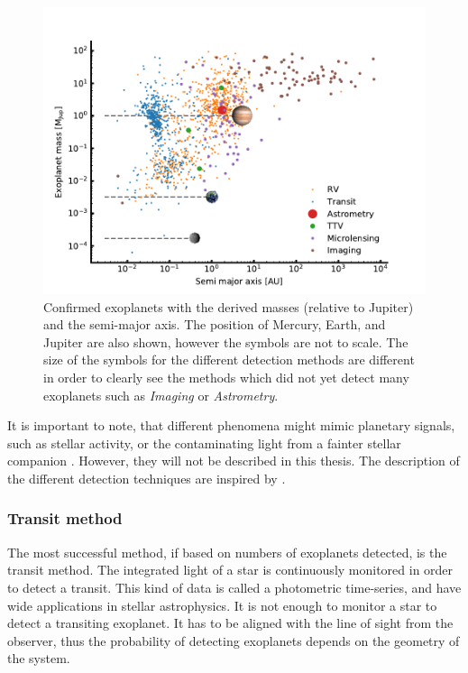 \begin{figure}[htpb!]
    \centering
    \includegraphics[width=1.0\linewidth]{figures/exoplanetDetectionType.pdf}
    \caption{Confirmed exoplanets with the derived masses (relative to Jupiter) and the semi-major
             axis. The position of Mercury, Earth, and Jupiter are also shown, however the symbols
             are not to scale. The size of the symbols for the different detection methods are
             different in order to clearly see the methods which did not yet detect many exoplanets
             such as \emph{Imaging} or \emph{Astrometry}.}
    \label{fig:detectionTypes}
\end{figure}

It is important to note, that different phenomena might mimic planetary signals, such as stellar
activity, or the contaminating light from a fainter stellar companion \citep[see
e.g.][]{Queloz2001,Oshagh2013,Oshagh2014}. However, they will not be described in this thesis.  The
description of the different detection techniques are inspired by \citet{Seager2010}.


\subsubsection{Transit method}
\label{sec:transitMethod}

The most successful method, if based on numbers of exoplanets detected, is the transit method. The
integrated light of a star is continuously monitored in order to detect a transit. This kind of data
is called a photometric time-series, and have wide applications in stellar astrophysics. It is not
enough to monitor a star to detect a transiting exoplanet. It has to be aligned with the line of
sight from the observer, thus the probability of detecting exoplanets depends on the geometry of the
system.

